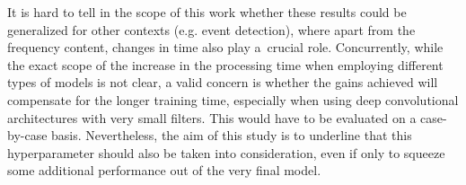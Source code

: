 \documentclass{article}
\begin{document}
\begin{sloppy}
It is hard to tell in the scope of this work whether these results could be generalized for other contexts (e.g. event detection), where apart from the frequency content, changes in time also play a~crucial role. Concurrently, while the exact scope of the increase in the processing time when employing different types of models is not clear, a valid concern is whether the gains achieved will compensate for the longer training time, especially when using deep convolutional architectures with very small filters. This would have to be evaluated on a case-by-case basis. Nevertheless, the aim of this study is to underline that this hyperparameter should also be taken into consideration, even if only to squeeze some additional performance out of the very final model.

\vspace{-6pt}
\begin{spacing}{0.93}




\end{spacing}

\end{sloppy}
\end{document}

